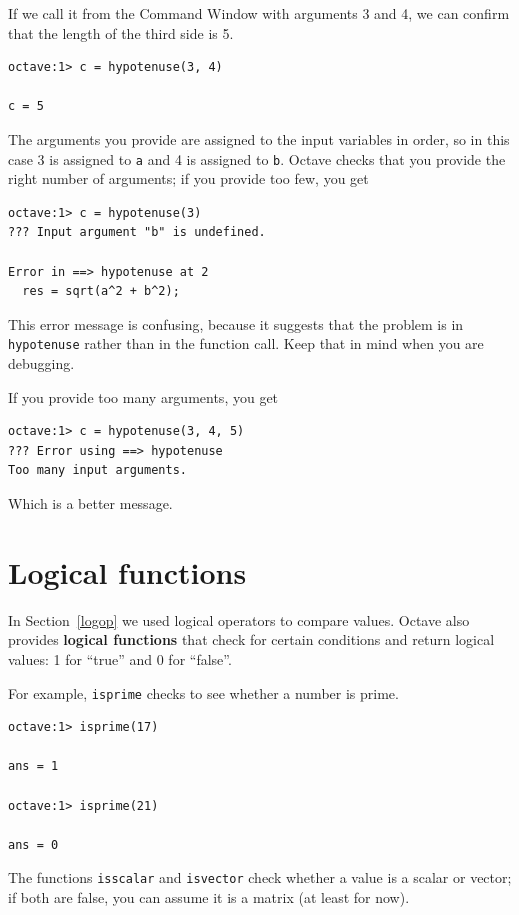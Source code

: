 \documentclass{book}
\begin{document}
If we call it from the Command Window with arguments 3 and 4, we can
confirm that the length of the third side is 5.

\begin{verbatim}
octave:1> c = hypotenuse(3, 4)

c = 5
\end{verbatim}

The arguments you provide are assigned to the input variables in
order, so in this case 3 is assigned to {\tt a} and 4 is assigned to
{\tt b}. Octave checks that you provide the right number of arguments;
if you provide too few, you get

\begin{verbatim}
octave:1> c = hypotenuse(3)
??? Input argument "b" is undefined.

Error in ==> hypotenuse at 2
  res = sqrt(a^2 + b^2);
\end{verbatim}

This error message is confusing, because it suggests that
the problem is in {\tt hypotenuse} rather than in the function call.
Keep that in mind when you are debugging.

If you provide too many arguments, you get

\begin{verbatim}
octave:1> c = hypotenuse(3, 4, 5)
??? Error using ==> hypotenuse
Too many input arguments.
\end{verbatim}

Which is a better message.


\section{Logical functions}

In Section~\ref{logop} we used logical operators to compare values.
Octave also provides {\bf logical functions} that check for certain
conditions and return logical values: 1 for ``true'' and 0 for ``false''.

For example, {\tt isprime} checks to see whether a number is prime.

\begin{verbatim}
octave:1> isprime(17)

ans = 1

octave:1> isprime(21)

ans = 0
\end{verbatim}

The functions {\tt isscalar} and {\tt isvector} check whether
a value is a scalar or vector; if both are false, you can assume
it is a matrix (at least for now).
\end{document}
